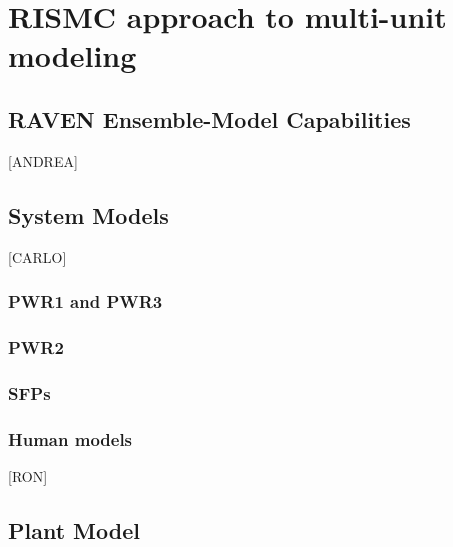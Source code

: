 \section{RISMC approach to multi-unit modeling}
\label{sec:RISMC_MU_modeling}



\subsection{RAVEN Ensemble-Model Capabilities}
[ANDREA]

\subsection{System Models}
[CARLO]
\subsubsection{PWR1 and PWR3}

\subsubsection{PWR2}

\subsubsection{SFPs}

\subsubsection{Human models}
[RON]

\subsection{Plant Model}

